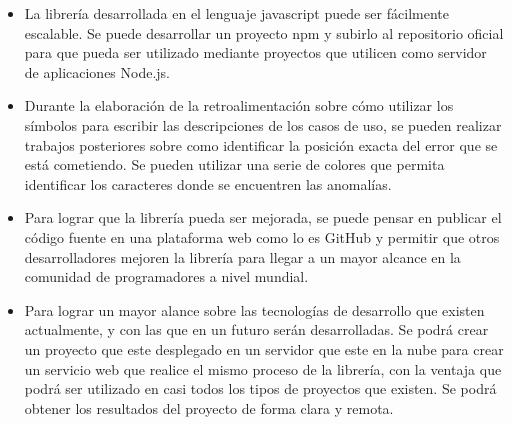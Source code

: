 \begin{itemize}
	\item La librería desarrollada en el lenguaje javascript puede ser fácilmente escalable. Se puede desarrollar un proyecto npm y subirlo al repositorio oficial para que pueda ser utilizado mediante proyectos que utilicen como servidor de aplicaciones Node.js. 
	\item Durante la elaboración de la retroalimentación sobre cómo utilizar los símbolos para escribir las descripciones de los casos de uso, se pueden realizar trabajos posteriores sobre como identificar la posición exacta del error que se está cometiendo. Se pueden utilizar una serie de colores que permita identificar los caracteres donde se encuentren las anomalías.
	\item Para lograr que la librería pueda ser mejorada, se puede pensar en publicar el código fuente en una plataforma web como lo es GitHub y permitir que otros desarrolladores  mejoren la librería para llegar a un mayor alcance en la comunidad de programadores a nivel mundial.
	\item Para lograr un mayor alance sobre las tecnologías de desarrollo que existen actualmente, y con las que en un futuro serán desarrolladas. Se podrá crear un proyecto que este desplegado en un servidor que este en la nube para crear un servicio web que realice el mismo proceso de la librería, con la ventaja que podrá ser utilizado en casi todos los tipos de proyectos que existen. Se podrá obtener los resultados del proyecto de forma clara y remota.  
\end{itemize}
